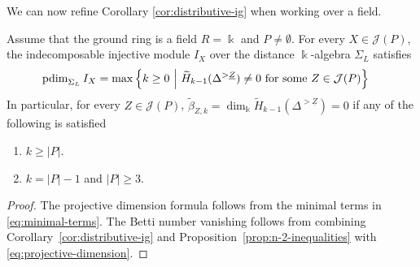 \documentclass[a4paper,leqno]{amsart}
\begin{document}
We can now refine Corollary \ref{cor:distributive-ig} when working over a field.
\begin{cor}\label{cor:SigmaJ(P) is IG} Assume that the ground ring is a field $R=\Bbbk$ and $P\neq\emptyset$.
For every $X\in\mathcal J(P)$, the indecomposable injective module $I_X$ over the distance $\Bbbk$-algebra $\Sigma_L$ satisfies
\begin{align}
 \operatorname{pdim}_{\Sigma_L} I_X
 &=\max\left\{k\geq0\ \middle|\
 \widetilde H_{k-1}(\Delta^{>\underline{Z}})\neq0
 \text{ for some }Z\in\mathcal J(P)\right\}
 \label{eq:projective-dimension}
\end{align}
In particular, for every $Z\in\mathcal J(P)$, $ \widetilde\beta_{Z,k} =\dim_{\Bbbk}\widetilde H_{k-1}(\Delta^{>\underline{Z}})=0$ if any of the following is satisfied
\begin{enumerate}
    \item $k\ge |P|$.
    \item $k=|P|-1$ and $|P|\ge 3$. 
\end{enumerate}
\end{cor}
\begin{proof}
The projective dimension formula follows from the minimal terms in \eqref{eq:minimal-terms}. 
The Betti number vanishing follows from combining Corollary~\ref{cor:distributive-ig} and Proposition~\ref{prop:n-2-inequalities} with \eqref{eq:projective-dimension}.
\end{proof}
\end{document}
